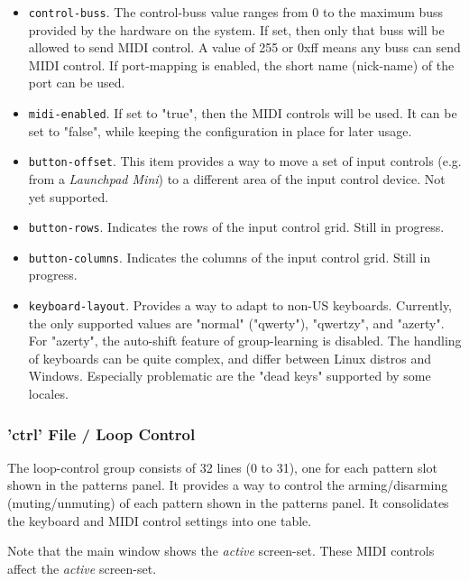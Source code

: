    \begin{itemize}
      \item \texttt{control-buss}.
         The control-buss value ranges from 0 to the maximum buss provided by
         the hardware on the system. If set, then only that buss will be allowed
         to send MIDI control.  A value of 255 or 0xff means any buss can send
         MIDI control. If port-mapping is enabled, the short name (nick-name) of
         the port can be used.
      \item \texttt{midi-enabled}.
         If set to "true", then the MIDI controls will be used.
         It can be set to "false", while keeping the configuration in place
         for later usage.
      \item \texttt{button-offset}.
         This item provides a way to move a set of input controls (e.g. from a
         \textsl{Launchpad Mini}) to a different area of the input control
         device.  Not yet supported.
      \item \texttt{button-rows}.
         Indicates the rows of the input control grid.
         Still in progress.
      \item \texttt{button-columns}.
         Indicates the columns of the input control grid.
         Still in progress.
      \item \texttt{keyboard-layout}.
         Provides a way to adapt to non-US keyboards.
         Currently, the only supported values are "normal" ("qwerty"), "qwertzy",
         and "azerty".
         For "azerty", the auto-shift feature of group-learning is disabled.
         The handling of keyboards can be quite complex, and differ between
         Linux distros and Windows.
         Especially problematic are the "dead keys" supported by some locales.
   \end{itemize}

\subsubsection{'ctrl' File / Loop Control}
\label{subsubsec:configuration_ctrl_loop_control}

   The loop-control group consists of 32 lines (0 to 31), one for each
   pattern slot shown in the patterns panel.
   It provides a way to control the arming/disarming (muting/unmuting) of
   each pattern shown in the patterns panel.
   It consolidates the keyboard and MIDI control settings into one table.

   Note that the main window shows the \textsl{active} screen-set.
   These MIDI controls affect the \textsl{active} screen-set.

